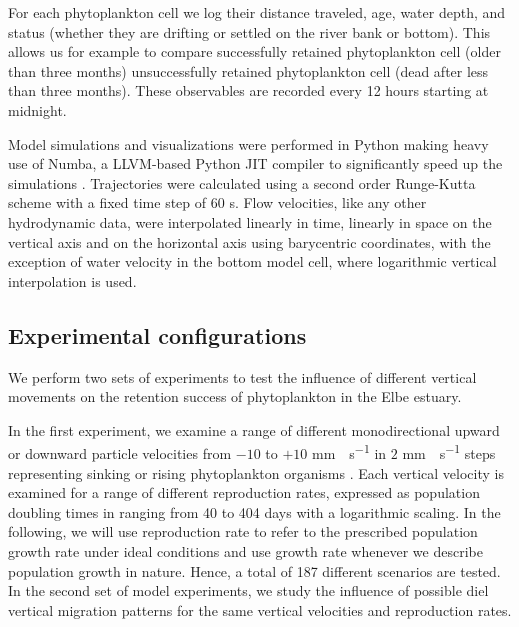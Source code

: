 \documentclass[npg, manuscript]{copernicus}
\begin{document}
For each phytoplankton cell we log their distance traveled, age, water depth, and status (whether they are drifting or settled on the river bank or bottom). This allows us for example to compare successfully retained phytoplankton cell (older than three months) unsuccessfully retained phytoplankton cell (dead after less than three months).
These observables are recorded every 12 hours starting at midnight.

Model simulations and visualizations were performed in Python making heavy use of Numba, a LLVM-based Python JIT compiler \citep{Lam2015} to significantly speed up the simulations \citep{Vennell2021}.
Trajectories were calculated using a second order Runge-Kutta scheme with a fixed time step of 60 \unit{s}.
Flow velocities, like any other hydrodynamic data, were interpolated linearly in time, linearly in space on the vertical axis and on the horizontal axis using barycentric coordinates, with the exception of water velocity in the bottom model cell, where logarithmic vertical interpolation is used.

\subsection{Experimental configurations}

We perform two sets of experiments to test the influence of different vertical movements on the retention success of phytoplankton in the Elbe estuary.

In the first experiment, we examine a range of different monodirectional upward or downward particle velocities from $-10$ to $+10$ \unit{mm\;s^{-1}} in $2$ \unit{mm\;s^{-1}} steps representing sinking or rising phytoplankton organisms \citep{Fennessy1996}.
Each vertical velocity is examined for a range of different reproduction rates, expressed as population doubling times in ranging from 40 to 404 days with a logarithmic scaling.
In the following, we will use reproduction rate to refer to the prescribed population growth rate under ideal conditions and use growth rate whenever we describe population growth in nature. 
Hence, a total of 187 different scenarios are tested.
In the second set of model experiments, we study the influence of possible diel vertical migration patterns for the same vertical velocities and reproduction rates.
\end{document}
